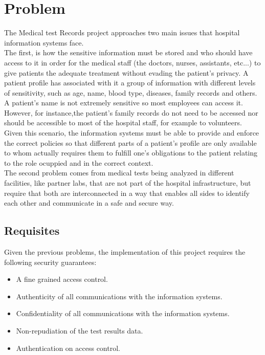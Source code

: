 \section{Problem}

The Medical test Records project approaches two main issues that hospital information systems face. \\

The first, is how the sensitive information must be stored  and who should have access to it in order for the medical staff (the doctors, nurses, assistants, etc...) to give patients the adequate treatment without evading the patient's privacy.
A patient profile has associated with it a group of information with different levels of sensitivity, such as age, name, blood type, diseases, family records and others.
A patient's name is not extremely sensitive so most employees can access it. However, for instance,the patient's family records do not need to be accessed nor should be accessible to most of the hospital staff, for example to volunteers. \\

Given this scenario, the information systems  must be able to provide and enforce the correct policies so that different parts of a patient's profile are only available to whom actually requires them to fulfill one's obligations to the patient relating to the role ocuppied and in the correct context. \\

The second problem comes from medical tests being analyzed in different facilities, like partner labs, that are not part of the hospital infrastructure, but require that both are interconnected in a way that enables all sides to identify each other and communicate in a safe and secure way. \\

\subsection{Requisites}

Given the previous problems, the implementation of this project requires the following security guarantees:
\begin{itemize}
	\item A fine grained access control.
	\item Authenticity of all communications with the information systems.
	\item Confidentiality of all communications with the information systems.
	\item Non-repudiation of the test results data.
	\item Authentication on access control.
\end{itemize}

